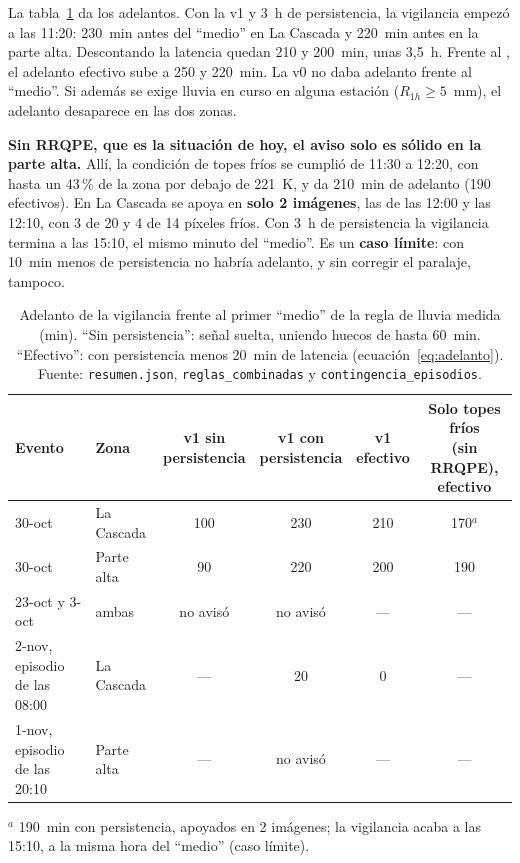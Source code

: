 \documentclass{sosg-informe}
\begin{document}
La tabla~\ref{tab:adelanto} da los adelantos. Con la v1 y 3~h de persistencia, la vigilancia empezó a las 11:20: 230~min antes del \enquote{medio} en La Cascada y 220~min antes en la parte alta. Descontando la latencia quedan 210 y 200~min, unas 3,5~h. Frente al \alto, el adelanto efectivo sube a 250 y 220~min. La v0 no daba adelanto frente al \enquote{medio}. Si además se exige lluvia en curso en alguna estación ($R_{1h} \geq 5$~mm), el adelanto desaparece en las dos zonas.

\textbf{Sin RRQPE, que es la situación de hoy, el aviso solo es sólido en la parte alta.} Allí, la condición de topes fríos se cumplió de 11:30 a 12:20, con hasta un 43\,\% de la zona por debajo de 221~K, y da 210~min de adelanto (190 efectivos). En La Cascada se apoya en \textbf{solo 2 imágenes}, las de las 12:00 y las 12:10, con 3 de 20 y 4 de 14 píxeles fríos. Con 3~h de persistencia la vigilancia termina a las 15:10, el mismo minuto del \enquote{medio}. Es un \textbf{caso límite}: con 10~min menos de persistencia no habría adelanto, y sin corregir el paralaje, tampoco.

\begin{table}[ht]
  \centering\small
  \caption{Adelanto de la vigilancia frente al primer \enquote{medio} de la regla de lluvia medida (min). \enquote{Sin persistencia}: señal suelta, uniendo huecos de hasta 60~min. \enquote{Efectivo}: con persistencia menos 20~min de latencia (ecuación~\ref{eq:adelanto}). Fuente: \texttt{resumen.json}, \texttt{reglas\_combinadas} y \texttt{contingencia\_episodios}.}
  \label{tab:adelanto}
  \setlength{\tabcolsep}{3.5pt}
  \begin{tabular}{llcccc}
    \toprule
    Evento & Zona & \makecell{v1 sin\\persistencia} & \makecell{v1 con\\persistencia} & \makecell{v1\\efectivo} & \makecell{Solo topes fríos\\(sin RRQPE), efectivo} \\
    \midrule
    30-oct & La Cascada & 100 & 230 & 210 & 170$^a$ \\
    30-oct & Parte alta & 90 & 220 & 200 & 190 \\
    23-oct y 3-oct & ambas & no avisó & no avisó & --- & --- \\
    2-nov, episodio de las 08:00 & La Cascada & --- & 20 & 0 & --- \\
    1-nov, episodio de las 20:10 & Parte alta & --- & no avisó & --- & --- \\
    \bottomrule
  \end{tabular}
  \par\vspace{3pt}\raggedright\footnotesize $^a$ 190~min con persistencia, apoyados en 2 imágenes; la vigilancia acaba a las 15:10, a la misma hora del \enquote{medio} (caso límite).
\end{table}
\end{document}
